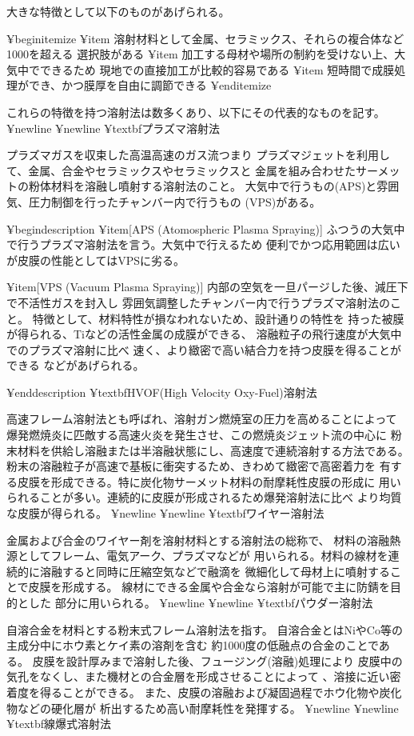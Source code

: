 大きな特徴として以下のものがあげられる。

¥begin{itemize}
	¥item 溶射材料として金属、セラミックス、それらの複合体など1000を超える
選択肢がある
	¥item 加工する母材や場所の制約を受けない上、大気中でできるため
現地での直接加工が比較的容易である
	¥item 短時間で成膜処理ができ、かつ膜厚を自由に調節できる
¥end{itemize}

これらの特徴を持つ溶射法は数多くあり、以下にその代表的なものを記す。
¥newline
¥newline
¥textbf{プラズマ溶射法}

プラズマガスを収束した高温高速のガス流つまり
プラズマジェットを利用して、金属、合金やセラミックスやセラミックスと
金属を組み合わせたサーメットの粉体材料を溶融し噴射する溶射法のこと。
大気中で行うもの(APS)と雰囲気、圧力制御を行ったチャンバー内で行うもの
(VPS)がある。

	¥begin{description}
		¥item[APS (Atomospheric Plasma Spraying)]	
		ふつうの大気中で行うプラズマ溶射法を言う。大気中で行えるため
		便利でかつ応用範囲は広いが皮膜の性能としてはVPSに劣る。
		
		¥item[VPS (Vacuum Plasma Spraying)] 
		内部の空気を一旦パージした後、減圧下で不活性ガスを封入し
		雰囲気調整したチャンバー内で行うプラズマ溶射法のこと。
		特徴として、材料特性が損なわれないため、設計通りの特性を
		持った被膜が得られる、Tiなどの活性金属の成膜ができる、
		溶融粒子の飛行速度が大気中でのプラズマ溶射に比べ
		速く、より緻密で高い結合力を持つ皮膜を得ることができる
		などがあげられる。
		
	¥end{description}
	¥textbf{HVOF(High Velocity Oxy-Fuel)溶射法}
	
	高速フレーム溶射法とも呼ばれ、溶射ガン燃焼室の圧力を高めることによって
	爆発燃焼炎に匹敵する高速火炎を発生させ、この燃焼炎ジェット流の中心に
	粉末材料を供給し溶融または半溶融状態にし、高速度で連続溶射する方法である。
	粉末の溶融粒子が高速で基板に衝突するため、きわめて緻密で高密着力を
	有する皮膜を形成できる。特に炭化物サーメット材料の耐摩耗性皮膜の形成に
	用いられることが多い。連続的に皮膜が形成されるため爆発溶射法に比べ
	より均質な皮膜が得られる。
	¥newline
	¥newline
	¥textbf{ワイヤー溶射法}
	
	金属および合金のワイヤー剤を溶射材料とする溶射法の総称で、
	材料の溶融熱源としてフレーム、電気アーク、プラズマなどが
	用いられる。材料の線材を連続的に溶融すると同時に圧縮空気などで融滴を
	微細化して母材上に噴射することで皮膜を形成する。
	線材にできる金属や合金なら溶射が可能で主に防錆を目的とした
	部分に用いられる。
	¥newline
	¥newline
	¥textbf{パウダー溶射法}
	
	自溶合金を材料とする粉末式フレーム溶射法を指す。
	自溶合金とはNiやCo等の主成分中にホウ素とケイ素の溶剤を含む
	約1000度の低融点の合金のことである。
	皮膜を設計厚みまで溶射した後、フュージング(溶融)処理により
	皮膜中の気孔をなくし、また機材との合金層を形成させることによって
	、溶接に近い密着度を得ることができる。
	また、皮膜の溶融および凝固過程でホウ化物や炭化物などの硬化層が
	析出するため高い耐摩耗性を発揮する。
	¥newline
	¥newline
	¥textbf{線爆式溶射法}
	

